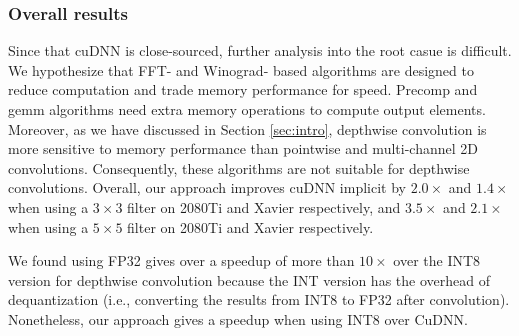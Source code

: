 \subsubsection{Overall results}
 Since that cuDNN is close-sourced, further analysis into the root casue is difficult. We hypothesize that
FFT- and Winograd- based algorithms are designed to reduce computation and trade memory performance for speed. Precomp and gemm algorithms
need extra memory operations to compute output elements. Moreover, as we have discussed in Section \ref{sec:intro}, depthwise convolution
is more sensitive to memory performance than pointwise and multi-channel 2D convolutions. Consequently, these algorithms are not suitable
for depthwise convolutions. Overall, our approach improves cuDNN implicit by $2.0\times$ and $1.4\times$ when using a $3 \times 3$  filter
on 2080Ti and Xavier respectively, and $3.5\times$ and $2.1\times$ when using a $5 \times 5$ filter on 2080Ti and Xavier respectively.

 We found using FP32 gives over a speedup of more than $10\times$ over the INT8 version for depthwise
convolution because the INT version has the overhead of dequantization (i.e., converting the results from INT8 to FP32 after convolution).
Nonetheless, our approach gives a  speedup when using INT8 over CuDNN.





